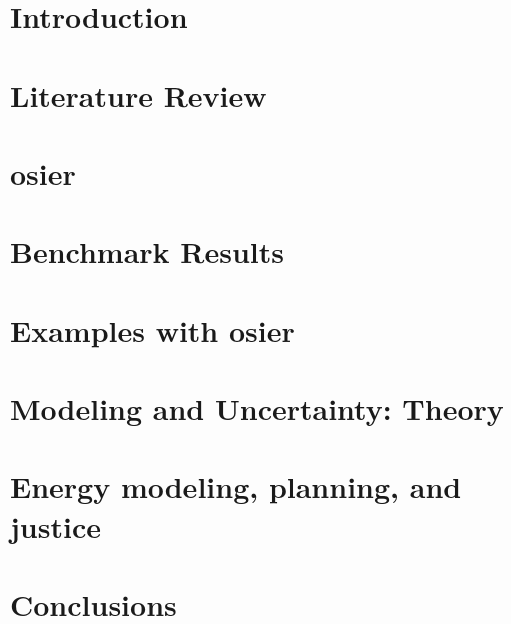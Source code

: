 \chapter{Introduction}
\label{chapter:introduction}
% 

\chapter{Literature Review}
\label{chapter:lit-review}
% 

\chapter{\acf{osier}}
\label{chapter:osier}
% 

\chapter{Benchmark Results}
\label{chapter:benchmark-results}
% 

\chapter{Examples with \acs{osier}}
\label{chapter:examples}
% 

\chapter{Modeling and Uncertainty: Theory}
\label{chapter:modeling-theory}


\chapter{Energy modeling, planning, and justice}
\label{chapter:communities}
% 

\chapter{Conclusions}
